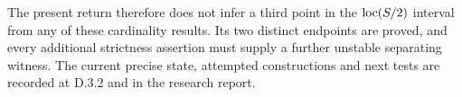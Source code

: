 The present return therefore does not infer a third point in the
$\operatorname{loc}(S/2)$ interval from any of these cardinality results. Its two
distinct endpoints are proved, and every additional strictness assertion
must supply a further unstable separating witness. The current precise
state, attempted constructions and next tests are recorded at D.3.2 and
in the research report.
